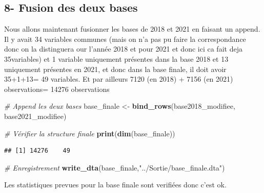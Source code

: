 \documentclass[
]{article}
\newenvironment{Shaded}{\begin{snugshade}}{\end{snugshade}}
\newcommand{\CommentTok}[1]{\textcolor[rgb]{0.56,0.35,0.01}{\textit{#1}}}
\newcommand{\FunctionTok}[1]{\textcolor[rgb]{0.13,0.29,0.53}{\textbf{#1}}}
\newcommand{\NormalTok}[1]{#1}
\newcommand{\OtherTok}[1]{\textcolor[rgb]{0.56,0.35,0.01}{#1}}
\newcommand{\StringTok}[1]{\textcolor[rgb]{0.31,0.60,0.02}{#1}}
\begin{document}
\hypertarget{fusion-des-deux-bases}{%
\subsection{8- Fusion des deux bases}\label{fusion-des-deux-bases}}

Nous allons maintenant fusionner les bases de 2018 et 2021 en faisant un
append. Il y avait 34 variables communes (mais on n'a pas pu faire la
correspondance donc on la distinguera our l'année 2018 et pour 2021 et
donc ici ca fait deja 35variables) et 1 variable uniquement présentes
dans la base 2018 et 13 uniquement présentes en 2021, et donc dans la
base finale, il doit avoir 35+1+13= 49 variables. Et par ailleurs 7120
(en 2018) + 7156 (en 2021) observations= 14276 observations

\begin{Shaded}
\begin{Highlighting}[]
\CommentTok{\# Append les deux bases}
\NormalTok{base\_finale }\OtherTok{\textless{}{-}} \FunctionTok{bind\_rows}\NormalTok{(base2018\_modifiee, base2021\_modifiee)}

\CommentTok{\# Vérifier la structure finale}
\FunctionTok{print}\NormalTok{(}\FunctionTok{dim}\NormalTok{(base\_finale))}
\end{Highlighting}
\end{Shaded}

\begin{verbatim}
## [1] 14276    49
\end{verbatim}

\begin{Shaded}
\begin{Highlighting}[]
\CommentTok{\# Enregistrement}
\FunctionTok{write\_dta}\NormalTok{(base\_finale,}\StringTok{"../Sortie/base\_finale.dta"}\NormalTok{)}
\end{Highlighting}
\end{Shaded}

Les statistiques prevues pour la base finale sont verifiées donc c'est
ok.
\end{document}
